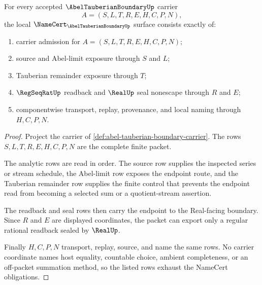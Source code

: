 \begin{theorem}
\label{thm:abel-tauberian-boundary-namecert-obligations}
For every accepted $\AbelTauberianBoundaryUp$ carrier
$$
A=(S,L,T,R,E,H,C,P,N),
$$
the local $\NameCert_{\AbelTauberianBoundaryUp}$ surface consists exactly of:
\begin{enumerate}
\item carrier admission for $A=(S,L,T,R,E,H,C,P,N)$;
\item source and Abel-limit exposure through $S$ and $L$;
\item Tauberian remainder exposure through $T$;
\item $\RegSeqRatUp$ readback and $\RealUp$ seal nonescape through $R$ and $E$;
\item componentwise transport, replay, provenance, and local naming through $H,C,P,N$.
\end{enumerate}
\end{theorem}
\begin{proof}
Project the carrier of \autoref{def:abel-tauberian-boundary-carrier}. The rows $S,L,T,R,E,H,C,P,N$ are the complete finite packet.

The analytic rows are read in order. The source row supplies the inspected series or stream schedule, the Abel-limit row exposes the endpoint route, and the Tauberian remainder row supplies the finite control that prevents the endpoint read from becoming a selected sum or a quotient-stream assertion.

The readback and seal rows then carry the endpoint to the Real-facing boundary. Since $R$ and $E$ are displayed coordinates, the packet can export only a regular rational readback sealed by $\RealUp$.

Finally $H,C,P,N$ transport, replay, source, and name the same rows. No carrier coordinate names host equality, countable choice, ambient completeness, or an off-packet summation method, so the listed rows exhaust the NameCert obligations.
\end{proof}

